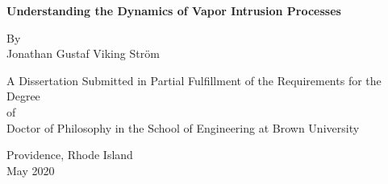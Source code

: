 \begin{titlepage}
\begin{center}
\vspace*{3cm}

{\huge\bfseries Understanding the Dynamics of Vapor Intrusion Processes
\par}

\vspace{2cm}
{\large By \\ Jonathan Gustaf Viking Ström\par}
\vfill

\vspace{2cm}
{\normalsize A Dissertation Submitted in Partial Fulfillment of the Requirements for the Degree\\ of\\ Doctor of Philosophy in the School of Engineering at Brown University\par}

\vfill
{\normalsize Providence, Rhode Island \\ May 2020\par}
\end{center}
\end{titlepage}
